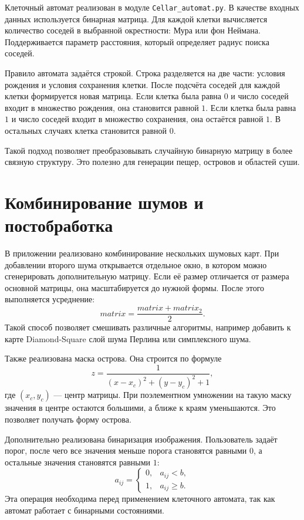 Клеточный автомат реализован в модуле \texttt{Cellar\_automat.py}. В качестве входных данных используется бинарная матрица. Для каждой клетки вычисляется количество соседей в выбранной окрестности: Мура или фон Неймана. Поддерживается параметр расстояния, который определяет радиус поиска соседей.

Правило автомата задаётся строкой. Строка разделяется на две части: условия рождения и условия сохранения клетки. После подсчёта соседей для каждой клетки формируется новая матрица. Если клетка была равна $0$ и число соседей входит в множество рождения, она становится равной $1$. Если клетка была равна $1$ и число соседей входит в множество сохранения, она остаётся равной $1$. В остальных случаях клетка становится равной $0$.

Такой подход позволяет преобразовывать случайную бинарную матрицу в более связную структуру. Это полезно для генерации пещер, островов и областей суши.

\section{Комбинирование шумов и постобработка}

В приложении реализовано комбинирование нескольких шумовых карт. При добавлении второго шума открывается отдельное окно, в котором можно сгенерировать дополнительную матрицу. Если её размер отличается от размера основной матрицы, она масштабируется до нужной формы. После этого выполняется усреднение:
\[
    matrix = \frac{matrix + matrix_2}{2}.
\]
Такой способ позволяет смешивать различные алгоритмы, например добавить к карте Diamond-Square слой шума Перлина или симплексного шума.

Также реализована маска острова. Она строится по формуле
\[
    z=\frac{1}{(x-x_c)^2+(y-y_c)^2+1},
\]
где $(x_c,y_c)$ --- центр матрицы. При поэлементном умножении на такую маску значения в центре остаются большими, а ближе к краям уменьшаются. Это позволяет получать форму острова.

Дополнительно реализована бинаризация изображения. Пользователь задаёт порог, после чего все значения меньше порога становятся равными $0$, а остальные значения становятся равными $1$:
\[
    a_{ij}=\begin{cases}
    0, & a_{ij}<b,\\
    1, & a_{ij}\ge b.
    \end{cases}
\]
Эта операция необходима перед применением клеточного автомата, так как автомат работает с бинарными состояниями.

